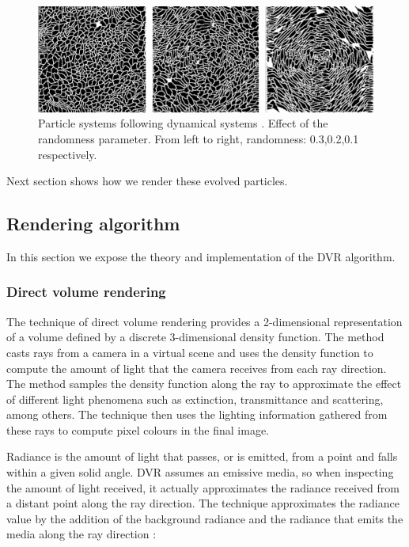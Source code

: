 \documentclass[oneside,a4paper,english,links]{amca}
\begin{document}
\begin{figure}[htb!]
  \centerline{\includegraphics[scale=0.21]{fig4}}
  \caption{Particle systems following dynamical systems . Effect of the randomness parameter. From left to right, randomness: 0.3,0.2,0.1 respectively. }
  \label{fg:fig4}
\end{figure}

Next section shows how we render these evolved particles.

\subsection{Rendering algorithm}

In this section we expose the theory and implementation of the DVR algorithm.

\subsubsection{Direct volume rendering}

The technique of direct volume rendering provides a
2-dimensional representation of a volume defined by a discrete
3-dimensional density function. The method casts rays from a camera in a virtual scene and uses the density function to
compute the amount of light that the camera receives from each
ray direction. The method samples the density function
along the ray to approximate the effect of different light
phenomena such as extinction, transmittance and scattering, among
others. The technique then uses the lighting information gathered from these rays to compute pixel colours in the final image.

Radiance is the amount of light that passes, or is emitted, from a
point and falls within a given solid angle. DVR assumes an emissive media, so when inspecting the amount of light received, it actually approximates
the radiance received from a distant point along the ray direction. The technique approximates the radiance value by the addition of the background radiance and the radiance that emits the media along the ray direction \citep{Kratz2006} : 
\end{document}
